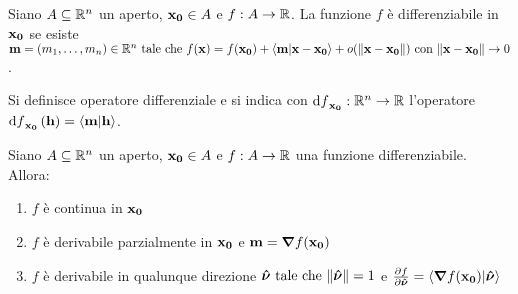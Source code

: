 \begin{definition}
    Siano $A \subseteq \mathbb{R}^n$ un aperto, $\vb{x_0} \in A$ e $f:A \to \mathbb{R}$. La funzione $f$ è differenziabile in $\vb{x_0}$ se esiste $\vb{m} = (m_1,\dots,m_n) \in \R^n \tc f(\vb{x}) = f(\vb{x_0}) + \ip{\vb{m}}{\vb{x} - \vb{x_0}} + o(\norm{\vb{x} - \vb{x_0}}) \with \norm{\vb{x}-\vb{x_0}}\to 0$.
\end{definition}

\begin{definition}
    Si definisce operatore differenziale e si indica con $\dd{f}_{\vb{x_0}} : \mathbb{R}^n \to \mathbb{R}$ l'operatore $\dd{f}_{\vb{x_0}}(\vb{h})=\ip{\vb{m}}{\vb{h}}$.
\end{definition}

\begin{theorem}
    Siano $A \subseteq \mathbb{R}^n$ un aperto, $\vb{x_0} \in A$ e $f:A \to \mathbb{R}$ una funzione differenziabile. Allora:
    \begin{enumerate}
        \item $f$ è continua in $\vb{x_0}$
        \item $f$ è derivabile parzialmente in $\vb{x_0}$ e $\vb{m} = \bm{\nabla}f(\vb{x_0})$
        \item $f$ è derivabile in qualunque direzione $\bm{\hat{\nu}} \text{ tale che } \norm{\bm{\hat{\nu}}}=1$ e $\frac{\partial f}{\partial \bm{\hat{\nu}}} = \ip{\grad f(\vb{x_0})}{\bm{\hat{\nu}}}$
    \end{enumerate}
\end{theorem}

